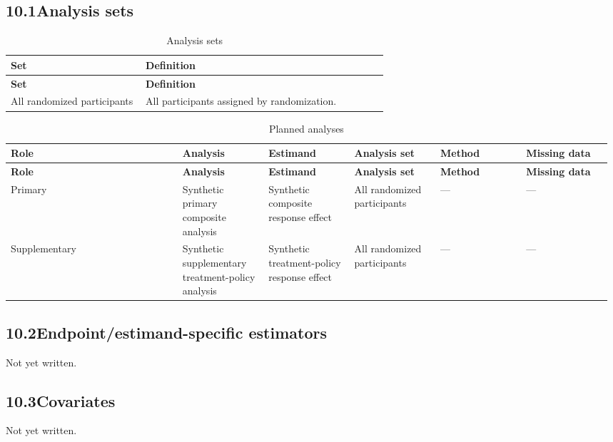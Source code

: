 \documentclass[11pt,a4paper]{article}
\newcommand{\psnote}[2]{\par\noindent\colorbox{#1!8}{\parbox{\dimexpr\linewidth-2\fboxsep}{\small\color{#1}#2}}\par}
\begin{document}
\subsection{10.1\quad Analysis sets}\label{section.10.1}
\begin{longtable}{@{}>{\RaggedRight}p{0.35\linewidth}>{\RaggedRight}p{0.63\linewidth}@{}}
\caption{Analysis sets}\\ \toprule
\textbf{\small Set} & \textbf{\small Definition} \\ \midrule\endfirsthead
\textbf{\small Set} & \textbf{\small Definition} \\ \midrule\endhead
\small All randomized participants & \small All participants assigned by randomization. \\
\bottomrule
\end{longtable}
\begin{longtable}{@{}>{\RaggedRight}p{0.28\linewidth}>{\RaggedRight}p{0.14\linewidth}>{\RaggedRight}p{0.14\linewidth}>{\RaggedRight}p{0.14\linewidth}>{\RaggedRight}p{0.14\linewidth}>{\RaggedRight}p{0.14\linewidth}@{}}
\caption{Planned analyses}\\ \toprule
\textbf{\small Role} & \textbf{\small Analysis} & \textbf{\small Estimand} & \textbf{\small Analysis set} & \textbf{\small Method} & \textbf{\small Missing data} \\ \midrule\endfirsthead
\textbf{\small Role} & \textbf{\small Analysis} & \textbf{\small Estimand} & \textbf{\small Analysis set} & \textbf{\small Method} & \textbf{\small Missing data} \\ \midrule\endhead
\small Primary & \small Synthetic primary composite analysis & \small Synthetic composite response effect & \small All randomized participants & \small --- & \small --- \\
\small Supplementary & \small Synthetic supplementary treatment-policy analysis & \small Synthetic treatment-policy response effect & \small All randomized participants & \small --- & \small --- \\
\bottomrule
\end{longtable}
\subsection{10.2\quad Endpoint/estimand-specific estimators}\label{section.10.2}
\psnote{pswarn}{Not yet written.}
\subsection{10.3\quad Covariates}\label{section.10.3}
\psnote{pswarn}{Not yet written.}
\end{document}
